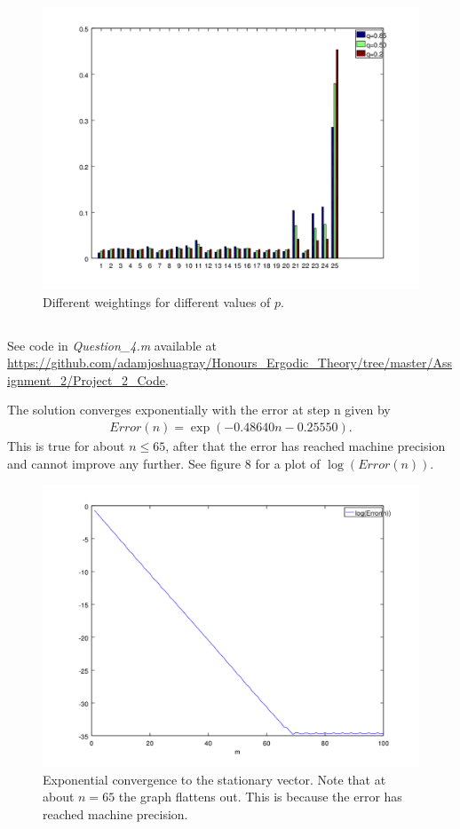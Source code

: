 \documentclass{unswmaths}
\begin{document}
\begin{figure}[h]
    \includegraphics[scale=0.7]{Different_ps}
    \caption{Different weightings for different values of $ p $.}
\end{figure}
\clearpage
\subsection{}
See code in \emph{Question\_4.m} available at \url{https://github.com/adamjoshuagray/Honours_Ergodic_Theory/tree/master/Assignment_2/Project_2_Code}. 

The solution converges exponentially with the error at step n given by
\begin{align*}
    Error(n) = \exp(-0.48640n - 0.25550).
\end{align*}
This is true for about $ n \leq 65 $, after that the error has reached machine precision and cannot improve any further.
See figure 8 for a plot of $ \log(Error(n)) $.

\begin{figure}[h]
    \includegraphics[scale=0.5]{Log_Error_n}
    \caption{Exponential convergence to the stationary vector. Note that at about $n = 65 $ the graph flattens out. This is because the error has reached machine precision.}
\end{figure}
\end{document}
